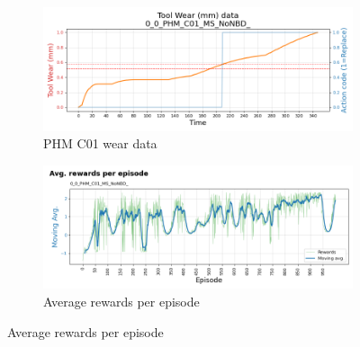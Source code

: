 \documentclass[a4paper, 12pt]{article}
\begin{document}
\begin{figure}[ht]
	\begin{subfigure}[b]{0.5\textwidth}
		\centering
		\includegraphics[width=\textwidth]{images/TrainingPlots/0_0_PHM_C01_MS_NoNBD__wear_plot.png}  
		\caption{PHM C01 wear data}
		\label{fig:C01wear}
	\end{subfigure}
	\hfill
	\begin{subfigure}[b]{0.5\textwidth}
		\centering
		\includegraphics[width=\textwidth]{images/TrainingPlots/0_0_PHM_C01_MS_NoNBD__Avg_episode_rewards.png}  
		\caption{Average rewards per episode}
		\label{fig:C01rewards}
	\end{subfigure} \par\bigskip
	

\end{figure}
\end{document}
